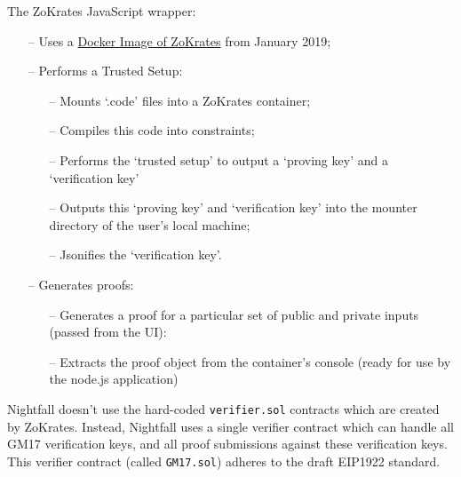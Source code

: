 The ZoKrates JavaScript wrapper:
\begin{itemize} \itemsep-0.5em
  \item[--] Uses a \href{https://hub.docker.com/r/michaelconnor/zok}{Docker Image of ZoKrates} from January 2019;
  \item[--] Performs a Trusted Setup: 
  \begin{itemize}
    \item[--] Mounts `.code' files into a ZoKrates container;
    \item[--] Compiles this code into constraints;
    \item[--] Performs the `trusted setup' to output a `proving key' and a `verification key'
    \item[--] Outputs this `proving key' and `verification key' into the mounter directory of the user's local machine;
    \item[--] Jsonifies the `verification key'.
  \end{itemize}  
  \item[--] Generates proofs:
  \begin{itemize}
    \item[--] Generates a proof for a particular set of public and private inputs (passed from the UI):
    \item[--] Extracts the proof object from the container's console (ready for use by the node.js application)
  \end{itemize} 
\end{itemize}

Nightfall doesn't use the hard-coded \texttt{verifier.sol} contracts which are created by ZoKrates. Instead, Nightfall uses a single verifier contract which can handle all GM17 verification keys, and all proof submissions against these verification keys. This verifier contract (called \texttt{GM17.sol}) adheres to the draft EIP1922 standard.

